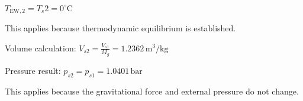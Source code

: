 \( T_{\text{EW},2} = T_s2 = 0^\circ \text{C} \)  

This applies because thermodynamic equilibrium is established.  

Volume calculation:  
\( V_{s2} = \frac{V_{s1}}{M_g} = 1.2362 \, \text{m}^3/\text{kg} \)  

Pressure result:  
\( p_{s2} = p_{s1} = 1.0401 \, \text{bar} \)  

This applies because the gravitational force and external pressure do not change.
